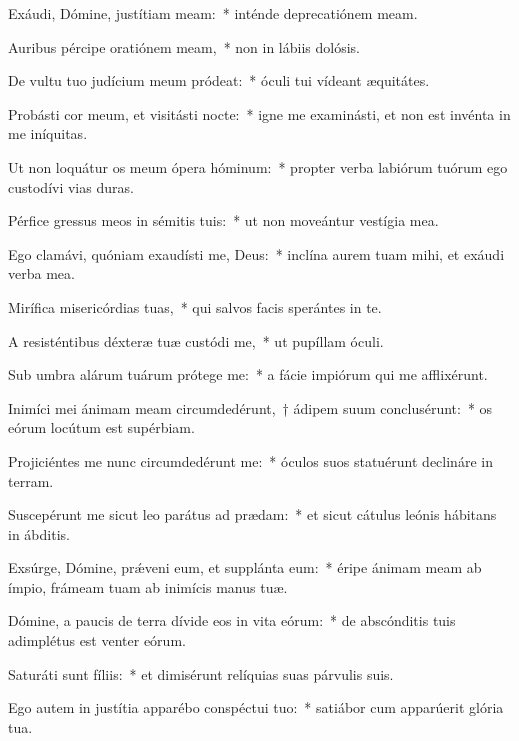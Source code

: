\item Exáudi, Dómine, justítiam meam:~* inténde deprecatiónem meam.

\item Auribus pércipe oratiónem meam,~* non in lábiis dolósis.

\item De vultu tuo judícium meum pródeat:~* óculi tui vídeant æquitátes.

\item Probásti cor meum, et visitásti nocte:~* igne me examinásti, et non est invénta in me iníquitas.

\item Ut non loquátur os meum ópera hóminum:~* propter verba labiórum tuórum ego custodívi vias duras.

\item Pérfice gressus meos in sémitis tuis:~* ut non moveántur vestígia mea.

\item Ego clamávi, quóniam exaudísti me, Deus:~* inclína aurem tuam mihi, et exáudi verba mea.

\item Mirífica misericórdias tuas,~* qui salvos facis sperántes in te.

\item A resisténtibus déxteræ tuæ custódi me,~* ut pupíllam óculi.

\item Sub umbra alárum tuárum prótege me:~* a fácie impiórum qui me afflixérunt.

\item Inimíci mei ánimam meam circumdedérunt,~† ádipem suum conclusérunt:~* os eórum locútum est supérbiam.

\item Projiciéntes me nunc circumdedérunt me:~* óculos suos statuérunt declináre in terram.

\item Suscepérunt me sicut leo parátus ad prædam:~* et sicut cátulus leónis hábitans in ábditis.

\item Exsúrge, Dómine, prǽveni eum, et supplánta eum:~* éripe ánimam meam ab ímpio, frámeam tuam ab inimícis manus tuæ.

\item Dómine, a paucis de terra dívide eos in vita eórum:~* de abscónditis tuis adimplétus est venter eórum.

\item Saturáti sunt fíliis:~* et dimisérunt relíquias suas párvulis suis.

\item Ego autem in justítia apparébo conspéctui tuo:~* satiábor cum apparúerit glória tua.
